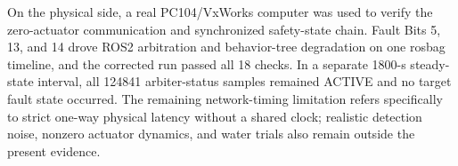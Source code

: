 \begin{abstract*}
  On the physical side, a real PC104/VxWorks computer was used to verify the zero-actuator communication and synchronized safety-state chain. Fault Bits 5, 13, and 14 drove ROS2 arbitration and behavior-tree degradation on one rosbag timeline, and the corrected run passed all 18 checks. In a separate 1800-s steady-state interval, all 124841 arbiter-status samples remained ACTIVE and no target fault state occurred. The remaining network-timing limitation refers specifically to strict one-way physical latency without a shared clock; realistic detection noise, nonzero actuator dynamics, and water trials also remain outside the present evidence.

\end{abstract*}
